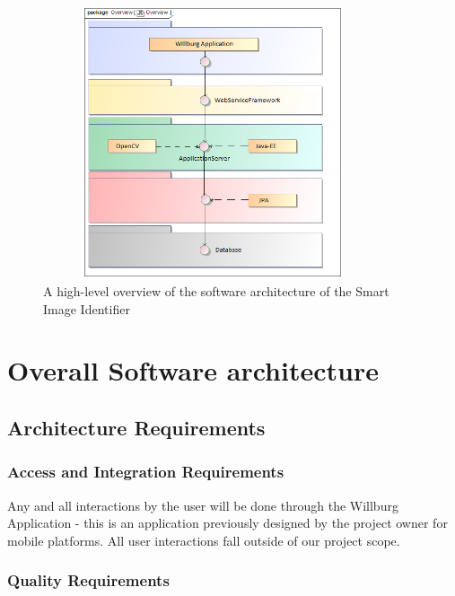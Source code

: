 \documentclass[a4paper,12pt]{report}
\begin{document}
	\begin{figure}[htb]
		\centering
		\includegraphics [height= 8cm, width=10cm]{../Diagrams/SystemOverview.png}
		\caption{A high-level overview of the software architecture of the Smart Image Identifier}
	\end{figure}


\section {Overall Software architecture}	
\subsection{Architecture Requirements}
\subsubsection{Access and Integration Requirements}
Any and all interactions by the user will be done through the Willburg Application - this is an application previously designed by the project owner for mobile platforms. All user interactions fall outside of our project scope. 
\newpage
\subsubsection{Quality Requirements}
\end{document}
